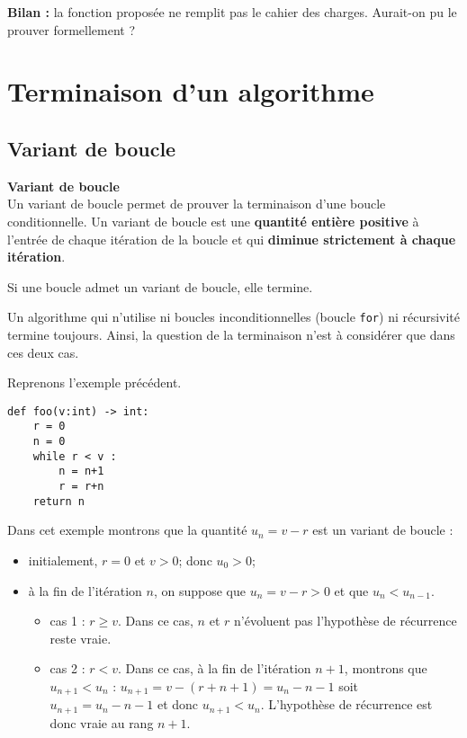 \bigskip

\textbf{Bilan : } la fonction proposée ne remplit pas le cahier des charges. Aurait-on pu le prouver formellement ?

\section{Terminaison d'un algorithme}

\subsection{Variant de boucle}
\begin{defi} \textbf{Variant de boucle} \\
Un variant de boucle permet de prouver la terminaison d'une boucle conditionnelle.  Un variant de boucle est une \textbf{quantité entière positive} à l’entrée de chaque
itération de la boucle et qui \textbf{diminue strictement à chaque itération}.
\end{defi}

\begin{theorem}
Si une boucle admet un variant de boucle, elle termine.
\end{theorem}

\begin{rem}
Un algorithme qui n’utilise ni boucles inconditionnelles (boucle \texttt{for}) ni récursivité termine toujours. Ainsi,
la question de la terminaison n’est à considérer que dans ces deux cas.
\end{rem}

Reprenons l'exemple précédent. 
\begin{lstlisting}
def foo(v:int) -> int:
    r = 0
    n = 0
    while r < v : 
        n = n+1
        r = r+n
    return n
\end{lstlisting}

Dans cet exemple montrons que la quantité $u_n = v-r$ est un variant de boucle : 
\begin{itemize}
\item initialement, $r=0$ et $v>0$; donc  $u_0 > 0$;
\item à la fin de l'itération $n$, on suppose que $u_n = v-r >0$ et que $u_n < u_{n-1}$. 
\begin{itemize}
\item cas 1 : $r\geq v$. Dans ce cas, $n$ et $r$ n'évoluent pas l'hypothèse de récurrence reste vraie. 
\item cas 2 : $r < v$. Dans ce cas, à la fin de l'itération $n+1$,  montrons que  $u_{n+1} < u_{n}$ : $u_{n+1} = v - (r + n + 1) =  u_n -n - 1$ soit $u_{n+1} =u_n -n - 1$ et donc $u_{n+1} < u_{n}$. L'hypothèse de récurrence est donc vraie au rang $n+1$. 
\end{itemize}
\end{itemize}

